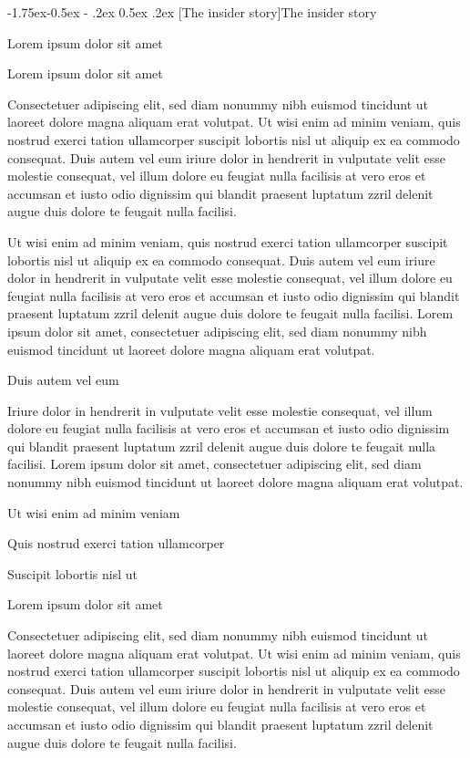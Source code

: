 \documentclass[11pt,twoside]{article}\makeatletter
\makeatletter
\renewcommand\subsection{\@startsection{subsection}{2}{\z@}%
     {-1.75ex\@plus -0.5ex \@minus- .2ex}%
     {0.5ex \@plus .2ex}%
     {\reset@font\Large\sffamily}}
\makeatother
\begin{document}
\subsection[{The insider story}]{The insider story}\label{part2.1}\par
Lorem ipsum dolor sit amet\par
Lorem ipsum dolor sit amet\par
Consectetuer adipiscing elit, sed diam nonummy nibh euismod tincidunt ut laoreet dolore magna aliquam erat volutpat. Ut wisi enim ad minim veniam, quis nostrud exerci tation ullamcorper suscipit lobortis nisl ut aliquip ex ea commodo consequat. Duis autem vel eum iriure dolor in hendrerit in vulputate velit esse molestie consequat, vel illum dolore eu feugiat nulla facilisis at vero eros et accumsan et iusto odio dignissim qui blandit praesent luptatum zzril delenit augue duis dolore te feugait nulla facilisi.\par
Ut wisi enim ad minim veniam, quis nostrud exerci tation ullamcorper suscipit lobortis nisl ut aliquip ex ea commodo consequat. Duis autem vel eum iriure dolor in hendrerit in vulputate velit esse molestie consequat, vel illum dolore eu feugiat nulla facilisis at vero eros et accumsan et iusto odio dignissim qui blandit praesent luptatum zzril delenit augue duis dolore te feugait nulla facilisi. Lorem ipsum dolor sit amet, consectetuer adipiscing elit, sed diam nonummy nibh euismod tincidunt ut laoreet dolore magna aliquam erat volutpat. \par
Duis autem vel eum \par
Iriure dolor in hendrerit in vulputate velit esse molestie consequat, vel illum dolore eu feugiat nulla facilisis at vero eros et accumsan et iusto odio dignissim qui blandit praesent luptatum zzril delenit augue duis dolore te feugait nulla facilisi. Lorem ipsum dolor sit amet, consectetuer adipiscing elit, sed diam nonummy nibh euismod tincidunt ut laoreet dolore magna aliquam erat volutpat. \par
Ut wisi enim ad minim veniam\par
Quis nostrud exerci tation ullamcorper \par
Suscipit lobortis nisl ut \par
Lorem ipsum dolor sit amet\par
Consectetuer adipiscing elit, sed diam nonummy nibh euismod tincidunt ut laoreet dolore magna aliquam erat volutpat. Ut wisi enim ad minim veniam, quis nostrud exerci tation ullamcorper suscipit lobortis nisl ut aliquip ex ea commodo consequat. Duis autem vel eum iriure dolor in hendrerit in vulputate velit esse molestie consequat, vel illum dolore eu feugiat nulla facilisis at vero eros et accumsan et iusto odio dignissim qui blandit praesent luptatum zzril delenit augue duis dolore te feugait nulla facilisi.\par
\end{document}
